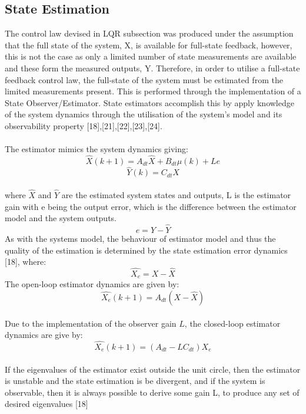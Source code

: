 \documentclass[12pt,a4paper,twoside]{report}
\begin{document}
			\subsection{State Estimation}
			
				The control law devised in LQR subsection was produced under the assumption that the full state of the system, X, is available for full-state feedback, however, this is not the case as only a limited number of state measurements are available and these form the measured outputs, Y. Therefore, in order to utilise a full-state feedback control law, the full-state of the system must be estimated from the limited measurements present. This is performed through the implementation of a State Observer/Estimator. State estimators accomplish this by apply knowledge of the system dynamics through the utilisation of the system's model and its observability property [18],[21],[22],[23],[24].
				\\ \\
				The estimator mimics the system dynamics giving: 
				\[
					\hat{X}(k+1) = A_{dt}\hat{X} + B_{dt} \mu(k) + L e
				\]
				\begin{equation}
					\hat{Y}(k) = C_{dt}\hat{X}
				\end{equation}
				\\
				where $\hat{X}$ and $\hat{Y}$ are the estimated system states and outputs, L is the estimator gain with e being the output error, which is the difference between the estimator model and the system outputs.
				\[
					e = Y - \hat{Y}
				\]
				As with the systems model, the behaviour of estimator model and thus the quality of the estimation is determined by the state estimation error dynamics [18], where:
				\[
					\hat{X_e} = X - \hat{X}
				\]
				The open-loop estimator dynamics are given by:
				\begin{equation}
					\hat{X_e}(k+1) = A_{dt}(X - \hat{X})
				\end{equation}
				\\
				Due to the implementation of the observer gain $L$, the closed-loop estimator dynamics are give by:
				\begin{equation}
					\hat{X_e}(k+1) = (A_{dt} - L C_{dt})\hat{X_e}
				\end{equation}
				\\
				If the eigenvalues of the estimator exist outside the unit circle, then the estimator is unstable and the state estimation is be divergent, and if the system is observable, then it is always possible to derive some gain L, to produce any set of desired eigenvalues [18] 
				\\
\end{document}
